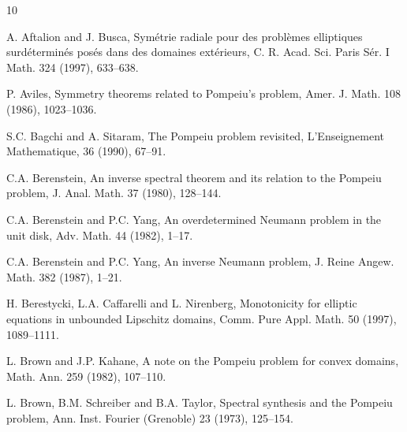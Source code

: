 \documentclass[12pt]{article}
\numberwithin{equation}{section}
\numberwithin{equation}{section}
\begin{document}
%

\providecommand{\bysame}{\leavevmode\hbox to3em{\hrulefill}\thinspace}
\providecommand{\MR}{\relax\ifhmode\unskip\space\fi MR }
\providecommand{\MRhref}[2]{%
  \href{http://www.ams.org/mathscinet-getitem?mr=#1}{#2}
}
\providecommand{\href}[2]{#2}
\begin{thebibliography}{10}

 A. Aftalion and J. Busca, Sym\'{e}trie radiale pour des probl\`{e}mes elliptiques surd\'{e}termin\'{e}s pos\'{e}s dans des domaines
ext\'{e}rieurs, C. R. Acad. Sci. Paris S\'{e}r. I Math. 324 (1997), 633--638.





 P. Aviles, Symmetry theorems related to Pompeiu's problem, Amer. J. Math. 108 (1986), 1023--1036.

 S.C. Bagchi and A. Sitaram, The Pompeiu problem revisited, L'Enseignement Mathematique, 36 (1990), 67--91.

 C.A. Berenstein, An inverse spectral theorem and its relation to the Pompeiu problem, J. Anal. Math. 37 (1980), 128--144.

 C.A. Berenstein and P.C. Yang, An overdetermined Neumann problem in the unit disk, Adv. Math. 44 (1982), 1--17.

 C.A. Berenstein and P.C. Yang, An inverse Neumann problem, J. Reine Angew. Math. 382 (1987), 1--21.

 H. Berestycki, L.A. Caffarelli and L. Nirenberg, Monotonicity for elliptic equations in unbounded Lipschitz domains,
Comm. Pure Appl. Math. 50 (1997), 1089--1111.

 L. Brown and J.P. Kahane, A note on the Pompeiu problem for convex domains, Math. Ann. 259 (1982), 107--110.

 L. Brown, B.M. Schreiber and B.A. Taylor, Spectral synthesis and the Pompeiu problem, Ann. Inst. Fourier (Grenoble) 23 (1973), 125--154.



\end{thebibliography}
\end{document}
